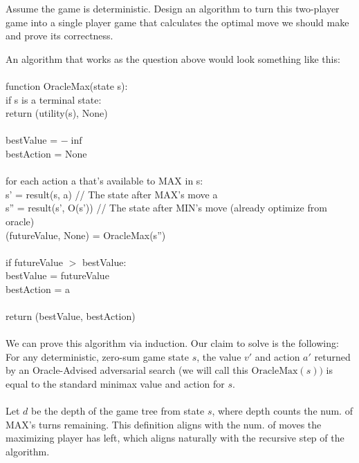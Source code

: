 \documentclass[11pt]{article}
\begin{document}
    \noindent Assume the game is deterministic. Design an algorithm to turn this two-player game into a single player game that calculates the optimal move we should make and prove its correctness.\newline

    \noindent An algorithm that works as the question above would look something like this: \\
    \\
    function OracleMax(state s):\\
    if s is a terminal state:\\
        \indent return (utility(s), None)\\
\\
    bestValue = $-\inf$\\
    bestAction = None\\
\\
    for each action a that's available to MAX in s:\\
        \indent s' = result(s, a)           // The state after MAX's move a\\
        \indent s'' = result(s', O(s'))     // The state after MIN's move (already optimize from oracle)\\
        \indent (futureValue, None) = OracleMax(s'')\\
\\
        \indent if futureValue $>$ bestValue:\\
            \indent \indent bestValue = futureValue\\
            \indent bestAction = a\\
\\
    return (bestValue, bestAction)\\
    \\
    \noindent We can prove this algorithm via induction. Our claim to solve is the following:
    \\
    For any deterministic, zero-sum game state $s$, the value $v'$ and action $a'$ returned by an Oracle-Advised adversarial search (we will call this $\text{OracleMax}(s))$ is equal to the standard minimax value and action for $s$. \\
    \\
    Let $d$ be the depth of the game tree from state $s$, where depth counts the num. of MAX's turns remaining. This definition aligns with the num. of moves the maximizing player has left, which aligns naturally with the recursive step of the algorithm. \\
\end{document}
